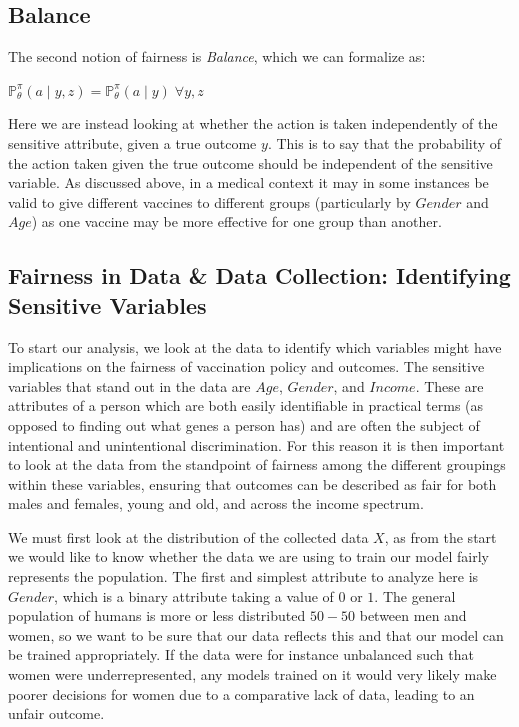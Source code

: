 \documentclass{article}
\begin{document}
\subsection{Balance}
\label{sec: Balance}
The second notion of fairness is \textit{Balance}, which we can formalize as:

\begin{center}
$\mathbb{P}^\pi_\theta(a\;|\;y,z) = \mathbb{P}^\pi_\theta(a\;|\;y) \; \forall y, z$
\end{center}

Here we are instead looking at whether the action is taken independently of the sensitive attribute, given a true outcome $y$. This is to say that the probability of the action taken given the true outcome should be independent of the sensitive variable. As discussed above, in a medical context it may in some instances be valid to give different vaccines to different groups (particularly by $Gender$ and $Age$) as one vaccine may be more effective for one group than another.

\subsection{Fairness in Data \& Data Collection: Identifying Sensitive Variables}
\graphicspath{{pictures}}
To start our analysis, we look at the data to identify which variables might have implications on the fairness of vaccination policy and outcomes. The sensitive variables that stand out in the data are $Age$, $Gender$, and $Income$. These are attributes of a person which are both easily identifiable in practical terms (as opposed to finding out what genes a person has) and are often the subject of intentional and unintentional discrimination. For this reason it is then important to look at the data from the standpoint of fairness among the different groupings within these variables, ensuring that outcomes can be described as fair for both males and females, young and old, and across the income spectrum. 

We must first look at the distribution of the collected data $X$, as from the start we would like to know whether the data we are using to train our model fairly represents the population. The first and simplest attribute to analyze here is $Gender$, which is a binary attribute taking a value of $0$ or $1$. The general population of humans is more or less distributed $50-50$ between men and women, so we want to be sure that our data reflects this and that our model can be trained appropriately. If the data were for instance unbalanced such that women were underrepresented, any models trained on it would very likely make poorer decisions for women due to a comparative lack of data, leading to an unfair outcome.
\end{document}
